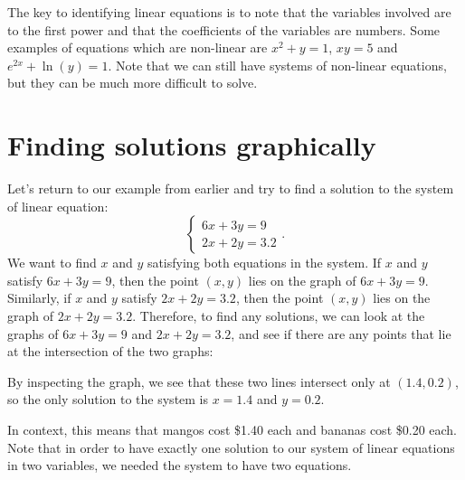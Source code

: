 \documentclass[nooutcomes]{ximera}
\begin{document}
The key to identifying linear equations is to note that the variables involved are to the first power and that the coefficients of the variables are numbers. Some examples of equations which are non-linear are $x^2+y = 1$, $xy = 5$ and $e^{2x} + \ln(y) = 1$. Note that we can still have systems of non-linear equations, but they can be much more difficult to solve. 

\section{Finding solutions graphically}
Let's return to our example from earlier and try to find a solution to the system of linear equation:
$$
\begin{cases}
6x + 3y = 9 \\
2x + 2y = 3.2
\end{cases}.
$$
We want to find $x$ and $y$ satisfying both equations in the system. If $x$ and $y$ satisfy $6x + 3y = 9$, then the point $(x, y)$ lies on the graph of $6x + 3y = 9$. Similarly, if $x$ and $y$ satisfy $2x + 2y = 3.2$, then the point $(x, y)$ lies on the graph of $2x + 2y = 3.2$. Therefore, to find any solutions, we can look at the graphs of $6x + 3y = 9$ and $2x + 2y = 3.2$, and see if there are any points that lie at the intersection of the two graphs:

\begin{image}
\end{image}

By inspecting the graph, we see that these two lines intersect only at $(1.4, 0.2)$, so the only solution to the system is $x = 1.4$ and $y = 0.2$. 

In context, this means that mangos cost \$1.40 each and bananas cost \$0.20 each. Note that in order to have exactly one solution to our system of linear equations in two variables, we needed the system to have two equations.
\end{document}
